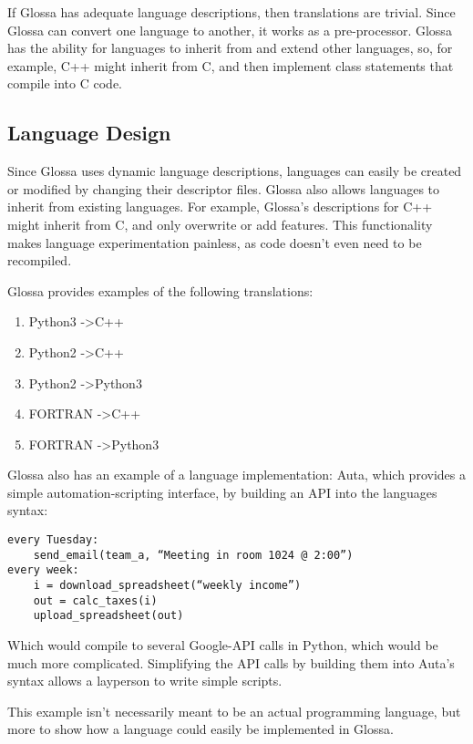 \documentclass{article}
\begin{document}
If Glossa has adequate language descriptions, then translations are trivial. 
Since Glossa can convert one language to another, it works as a pre-processor.
Glossa has the ability for languages to inherit from and extend other languages, so, for example, C++ might inherit from C, and then implement class statements that compile into C code.

\subsection{Language Design}

Since Glossa uses dynamic language descriptions, languages can easily be created or modified by changing their descriptor files. Glossa also allows languages to inherit from existing languages. For example, Glossa's descriptions for C++ might inherit from C, and only overwrite or add features.
This functionality makes language experimentation painless, as code doesn't even need to be recompiled.

Glossa provides examples of the following translations:
\begin{enumerate}
    \item Python3 -\textgreater C++
    \item Python2 -\textgreater C++ 
    \item Python2 -\textgreater Python3
    \item FORTRAN -\textgreater C++ 
    \item FORTRAN -\textgreater Python3 
\end{enumerate}
Glossa also has an example of a language implementation: Auta, which provides a simple automation-scripting interface, by building an API into the languages syntax:

\lstset{language=Python}
\begin{lstlisting}
every Tuesday:
    send_email(team_a, “Meeting in room 1024 @ 2:00”)
every week:
    i = download_spreadsheet(“weekly income”)
    out = calc_taxes(i)
    upload_spreadsheet(out)
\end{lstlisting}
Which would compile to several Google-API calls in Python, which would be much more complicated. 
Simplifying the API calls by building them into Auta's syntax allows a layperson to write simple scripts.

This example isn't necessarily meant to be an actual programming language, but more to show how a language could easily be implemented in Glossa.

\end{document}
